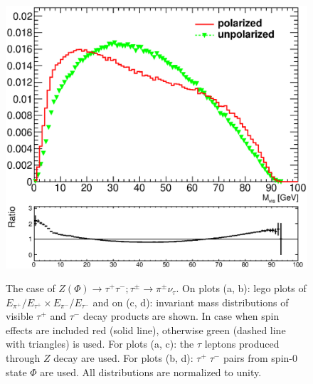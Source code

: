 \documentclass{article}
\begin{document}
\begin{figure}[h!]
{\includegraphics[scale=0.43]{h2_300_vis_mass_note.eps}
}
 \caption{\label{Fig:scattergams}  
The case of $Z (\Phi)  \to \tau^+ \tau^- ; \tau^\pm \to \pi^\pm \nu_\tau$.
On plots (a, b): lego plots of  $E_{\pi^+}/E_{\tau^+} \times E_{\pi^-}/E_{\tau^-}$
 and
on  (c, d):  invariant mass distributions of  visible $\tau^+$ and $\tau^-$ decay products are shown. In case when  
spin effects are included red (solid line), otherwise
green (dashed line with triangles) is used. For plots (a, c): the  $\tau$ leptons produced through $Z$ decay are used.
For plots (b, d): $\tau^+\;\tau^-$ pairs from spin-0 state $\Phi$ are used.
All distributions are normalized to unity.}
\end{figure}
\end{document}
